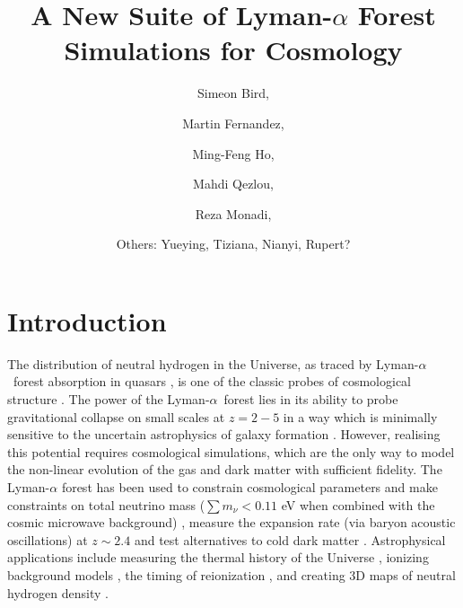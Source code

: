\documentclass[a4paper,11pt]{article}
\title{A New Suite of Lyman-$\alpha$ Forest Simulations for Cosmology}
\author[a]{Simeon Bird,\note{Corresponding author}}
\affiliation[a]{Department of Physics \& Astronomy, University of California  Riverside,\\900 University Avenue, Riverside, CA 92521, USA}
\author[a]{Martin Fernandez,}
\author[a]{Ming-Feng Ho,}
\author[a]{Mahdi Qezlou,}
\author[a]{Reza Monadi,}
\author[b]{Others: Yueying, Tiziana, Nianyi, Rupert?}
\newcommand{\Lya}{Lyman-$\alpha$}
\begin{document}
\maketitle

\section{Introduction}


The distribution of neutral hydrogen in the Universe, as traced by \Lya~forest absorption in quasars \cite{Gunn:1965}, is one of the classic probes of cosmological structure \citep{Croft:1998}. The power of the \Lya~forest lies in its ability to probe gravitational collapse on small scales at $z = 2-5$ in a way which is minimally sensitive to the uncertain astrophysics of galaxy formation \citep{Cen:1994,Zhang:1995,Miralda-Escude:1996,Hernquist:1996,Rauch:1997}. However, realising this potential requires cosmological simulations, which are the only way to model the non-linear evolution of the gas and dark matter with sufficient fidelity. The Lyman-$\alpha$ forest has been used to constrain cosmological parameters and make constraints on total neutrino mass ($\sum m_\nu < 0.11$ eV when combined with the cosmic microwave background) \citep{2004MNRAS.354..684V, McDonald:2005pk, Viel:2006, 2005PhRvD..71j3515S, 2006JCAP...10..014S, Rossi:2017, 2020JCAP...04..038P}, measure the expansion rate (via baryon acoustic oscillations) at $z \sim 2.4$ \cite{Slosar:2011, Bautista:2017, dSAgathe:2019} and test alternatives to cold dark matter \citep{2005PhRvD..71f3534V,  Viel:2013wdm, Irsic:2017pk, Garzilli:2021, 2021PhRvL.126g1302R}. Astrophysical applications include measuring the thermal history of the Universe \citep{2008MNRAS.386.1131B,2014MNRAS.438.2499B, 2016MNRAS.463.2335N, Boera:2019, Gaikwad:2021, Villasenor:2022, Yang:2023}, ionizing background models \cite{Puchwein:2019, FG:2020}, the timing of reionization \citep{Gaikwad:2017,Onorbe:2017,Chardin:2017,DAloisio:2017}, and creating 3D maps of neutral hydrogen density \citep{Lee:2016, Ozbek:2016, Lee:2018, Horowitz:2022, Qezlou:2022}.
\end{document}
